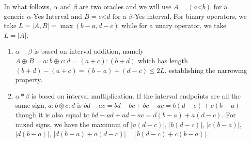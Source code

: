 \documentclass[12pt]{article}
\theoremstyle{remark}
\newcommand{\lt}{\mathord{<}}
\begin{document}
In what follows, $\alpha$ and $\beta$ are two oracles and we will use $A=(a\lt b)$ for a generic $\alpha$-Yes Interval and $B=c\lt d$ for  a $\beta$-Yes interval. For binary operators, we take $L = |A,B| = \max(b-a, d-c)$ while for a unary operator, we take $L = |A|$. 


\begin{enumerate}
    \item $\alpha+\beta$ is based on interval addition, namely $A \oplus B = a:b \oplus c:d = (a+c):(b+d)$ which has length $(b+d) - (a+c) = (b-a) + (d-c) \leq 2L$, establishing the narrowing property. 
    \item $\alpha * \beta$ is based on interval multiplication. If the interval endpoints are all the same sign, $a:b \otimes c:d$ is $bd-ac = bd -bc + bc -ac =  b(d-c) + c(b-a)$ though it is also equal to $bd - ad + ad - ac = d(b-a) + a(d-c)$. For mixed signs, we have the maximum of $|a(d-c)|$, $|b(d-c)|$, $|c(b-a)|$, $|d(b-a)|$, $|d(b-a)+a(d-c)| = |b(d-c) + c(b-a)|$. 
    

\end{enumerate}
\end{document}
